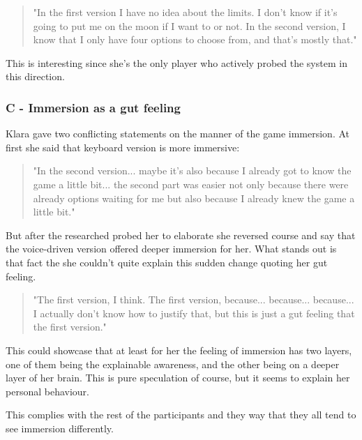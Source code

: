 \begin{quote}
    "In the first version I have no idea about the limits. I don't know if it's going to put me on the moon if I want to or not. In the second version, I know that I only have four options to choose from, and that's mostly that."
\end{quote}

This is interesting since she's the only player who actively probed the system in this direction. 

\subsubsection{C - Immersion as a gut feeling}


Klara gave two conflicting statements on the manner of the game immersion. At first she said that keyboard version is more immersive:

\begin{quote}
    "In the second version... maybe it's also because I already got to know the game a little bit... the second part was easier not only because there were already options waiting for me but also because I already knew the game a little bit."
\end{quote}

But after the researched probed her to elaborate she reversed course and say that the voice-driven version offered deeper immersion for her. What stands out is that fact the she couldn't quite explain this sudden change quoting her gut feeling.

\begin{quote}
    "The first version, I think. The first version, because... because... because... I actually don't know how to justify that, but this is just a gut feeling that the first version."
\end{quote}

This could showcase that at least for her the feeling of immersion has two layers, one of them being the explainable awareness, and the other being on a deeper layer of her brain. This is pure speculation of course, but it seems to explain her personal behaviour.



This complies with the rest of the participants and they way that they all tend to see immersion differently.



